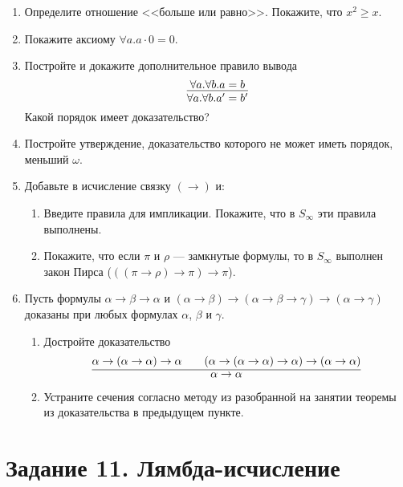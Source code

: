 \documentclass[10pt,a4paper,oneside]{article}
\begin{document}
\begin{enumerate}
\item Определите отношение <<больше или равно>>. Покажите, что $x^2 \ge x$.
\item Покажите аксиому $\forall a.a \cdot 0 = 0$.
\item Постройте и докажите дополнительное правило вывода $$\infer{\forall a.\forall b.a' = b'}{\forall a.\forall b.a = b}$$ 
Какой порядок имеет доказательство?
\item Постройте утверждение, доказательство которого не может иметь порядок, меньший $\omega$.
\item Добавьте в исчисление связку $(\rightarrow)$ и:
\begin{enumerate}
\item Введите правила для импликации. Покажите, что в $S_\infty$ эти правила выполнены.
\item Покажите, что если $\pi$ и $\rho$ --- замкнутые формулы, то 
в $S_\infty$ выполнен закон Пирса ($((\pi\rightarrow\rho)\rightarrow\pi)\rightarrow\pi$).
\end{enumerate}
\item Пусть формулы $\alpha\rightarrow\beta\rightarrow\alpha$ и
$(\alpha\rightarrow\beta)\rightarrow(\alpha\rightarrow\beta\rightarrow\gamma)\rightarrow(\alpha\rightarrow\gamma)$ 
доказаны при любых формулах $\alpha$, $\beta$ и $\gamma$. 
\begin{enumerate}
\item Достройте доказательство $$\infer{\alpha\rightarrow\alpha}{\alpha\rightarrow(\alpha\rightarrow\alpha)\rightarrow\alpha
                             \quad\quad(\alpha\rightarrow(\alpha\rightarrow\alpha)\rightarrow\alpha)\rightarrow(\alpha\rightarrow\alpha)}$$
\item Устраните сечения согласно методу из разобранной на занятии теоремы из доказательства в предыдущем пункте.
\end{enumerate}
\end{enumerate}

\section*{Задание 11. Лямбда-исчисление}
\end{document}
